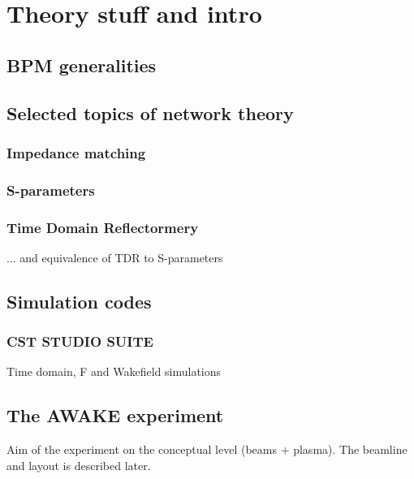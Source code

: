 \chapter{Theory stuff and intro}

\section[BPM generalities]{BPM generalities}

\section[Selected topics of network theory]{Selected topics of network theory}

\subsection[Impedance matching]{Impedance matching}

\subsection[S-parameters]{S-parameters}

\subsection[Time Domain Reflectormery]{Time Domain Reflectormery}

... and equivalence of TDR to S-parameters

\section[Simulation codes]{Simulation codes}

\subsection[CST STUDIO SUITE\textregistered]{CST STUDIO SUITE\textregistered}

Time domain, F and Wakefield simulations

\section[The AWAKE experiment]{The AWAKE experiment}

Aim of the experiment on the conceptual level (beams + plasma). The beamline and layout is described later.
